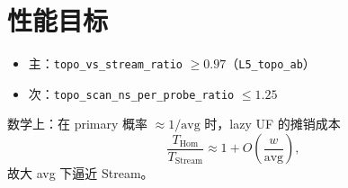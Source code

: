 \section{性能目标}

\begin{itemize}[nosep]
  \item 主：\texttt{topo\_vs\_stream\_ratio} $\ge 0.97$（\texttt{L5\_topo\_ab}）
  \item 次：\texttt{topo\_scan\_ns\_per\_probe\_ratio} $\le 1.25$
\end{itemize}

数学上：在 primary 概率 $\approx 1/\mathrm{avg}$ 时，lazy UF 的摊销成本
\begin{equation}
\frac{T_{\mathrm{Hom}}}{T_{\mathrm{Stream}}}
\approx 1 + O\!\left(\frac{w}{\mathrm{avg}}\right),
\end{equation}
故大 avg 下逼近 Stream。

